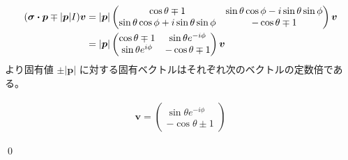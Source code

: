 \documentclass[uplatex,dvipdfmx,a4paper,11pt]{jlreq}
\makeatletter
\newcommand{\pp}{\bm{p}}
\theoremstyle{definition}
\renewenvironment{proof}[1][\proofname]{\par
  \normalfont
  \topsep6\p@\@plus6\p@ \trivlist
  \item[\hskip\labelsep{\bfseries #1}\@addpunct{\bfseries}]\ignorespaces\quad\par
}{%
  \qed\endtrivlist\@endpefalse
}
\renewcommand\proofname{証明}
\makeatother
\begin{document}
\begin{proof}
  \begin{align}
    (\bm{\sigma}\vdot\pp \mp |\pp|I)\bm{v} & = |\pp|\begin{pmatrix}
                                                      \cos\theta \mp 1                         & \sin\theta\cos\phi - i\sin\theta\sin\phi \\
                                                      \sin\theta\cos\phi + i\sin\theta\sin\phi & -\cos\theta \mp 1
                                                    \end{pmatrix}\bm{v} \\
                                           & = |\pp|\begin{pmatrix}
                                                      \cos\theta \mp 1     & \sin\theta e^{-i\phi} \\
                                                      \sin\theta e^{i\phi} & -\cos\theta \mp 1
                                                    \end{pmatrix}\bm{v}
  \end{align}
  より固有値 $\pm|\pp|$ に対する固有ベクトルはそれぞれ次のベクトルの定数倍である。

  \begin{align}
    \bm{v} = \begin{pmatrix}
               \sin\theta e^{-i\phi} \\
               -\cos\theta \pm 1
             \end{pmatrix}
  \end{align}

\end{proof}
\end{document}
